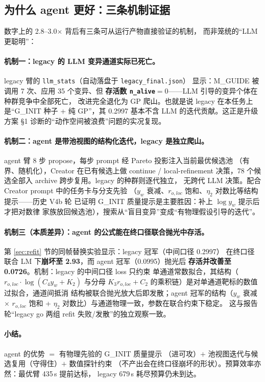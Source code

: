 \documentclass[11pt,a4paper]{ctexart}
\newcommand{\rol}{r_{o,loc}}
\newcommand{\yw}{y_w}
\newcommand{\et}{\eta_2}
\begin{document}
\subsection{为什么 agent 更好：三条机制证据}

数字上的 2.8--3.0$\times$ 背后有三条可从运行产物直接验证的机制，
而非笼统的``LLM 更聪明''：

\paragraph{机制一：legacy 的 LLM 变异通道实际已死亡。}
legacy 臂的 \texttt{llm\_stats}（自动落盘于 \texttt{legacy\_final.json}）
显示：M\_GUIDE 被调用 7 次、应用 35 个变异、但 \textbf{存活数
\texttt{n\_alive}$=0$}——LLM 引导的变异个体在种群竞争中全部死亡，
改进完全退化为 GP 爬山。也就是说 legacy 在本任务上是``G\_INIT 种子
+ 纯 GP''，其 0.2997 基本不含 LLM 的迭代贡献。这正是升级方案
\S 1 诊断的``动作空间被浪费''问题的实况复现。

\paragraph{机制二：agent 是带池视图的结构化迭代，legacy 是独立爬山。}
agent 臂 8 步 propose，每步 prompt 经 Pareto 投影注入当前最优候选池
（有界、随机化），Creator 在已有候选上做 continue / local-refinement
决策，78 个候选全部入 archive 跨步复用。legacy 的种群则逐代独立，
无跨代 LLM 决策。配合 Creator prompt 中的任务卡与分支先验
（$y_w$ 衰减、$\rol$ 饱和、$\et$ 对数比等结构提示——历史 V4b 轮
已证明 G\_INIT 质量提示是主要胜因：补上 $\log y_w$ 提示后才把对数律
家族放回候选池），搜索从``盲目变异''变成``有物理假设引导的迭代''。

\paragraph{机制三（本质差异）：agent 的公式能在终口径联合抛光中存活。}
第 \ref{sec:refit} 节的同帧替换实验显示：legacy 冠军（中间口径 0.2997）
在终口径联合 LM 下\textbf{崩坏至 2.93}，而 agent 冠军（0.0995）抛光后
\textbf{存活并改善至 0.0726}。机制：legacy 的中间口径 loss 只约束
单通道常数拟合，其结构（$\rol\cdot\log(C_4\yw+K_2)$ 与分母
$K_3\rol+C_2$ 的乘积链）是对单通道靶标的数值过拟合，通道间抵消
结构被联合抛光放大后即发散；agent 冠军的结构（$\yw$ 衰减 $\times$
$\rol$ 饱和 + $\et$ 对数比）与通道物理一致，参数在联合约束下稳定。
这与报告轮``legacy go 两组 refit 失败/发散''的独立观察一致。

\paragraph{小结。}agent 的优势 $=$ 有物理先验的 G\_INIT 质量提示
（进可攻）$+$ 池视图迭代与候选复用（守得住）$+$ 数值探针约束
（不产出会在终口径崩坏的形状）。预算效率亦然：最优臂 435\,s 提前达标，
legacy 679\,s 耗尽预算仍未到达。
\end{document}
